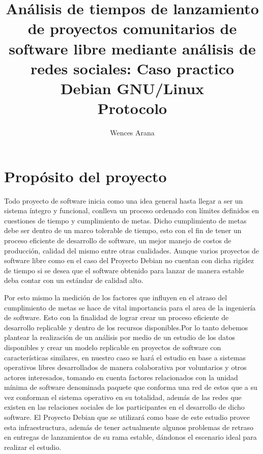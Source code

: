 \documentclass[12pt]{report}
\begin{document}
  \title{ {Análisis  de  tiempos  de  lanzamiento  de
proyectos comunitarios  de software  libre mediante análisis  de redes
sociales:   Caso   practico    Debian   GNU/Linux}
\\   {Protocolo}   }
\author{Wences Arana}
\maketitle

\tableofcontents
\chapter*{Propósito del proyecto}

Todo proyecto de software inicia como  una idea general hasta llegar a
ser un sistema  íntegro y funcional, conlleva un  proceso ordenado con
límites definidos  en cuestiones  de tiempo  y cumplimiento  de metas.
Dicho cumplimiento de  metas debe ser dentro de un  marco tolerable de
tiempo, esto con el fin de tener un proceso eficiente de desarrollo de
software, un mejor  manejo de costos de producción,  calidad del mismo
entre otras cualidades. Aunque varios proyectos de software libre como
en el caso del Proyecto Debian  no cuentan con dicha rigídez de tiempo
si se  desea que el  software obtenido  para lanzar de  manera estable
deba contar con un estándar de calidad alto.

Por esto mismo  la medición de los factores que  influyen en el atraso
del cumplimiento de metas se hace de vital importancia para el area de
la ingeniería  de software. Esto con  la finalidad de lograr  crear un
proceso eficiente  de desarrollo replicable  y dentro de  los recursos
disponibles.Por  lo  tanto  debemos  plantear  la  realización  de  un
análisis por medio  de un estudio de los datos  disponibles y crear un
modelo  replicable  en  proyectos   de  software  con  características
similares,  en nuestro  caso se  hará el  estudio en  base a  sistemas
operativos libres desarrollados de manera colaborativa por voluntarios
y otros  actores interesados, tomando en  cuenta factores relacionados
con la unidad  mínima de software denominada paquete  que conforma una
red  de estos  que  a su  vez  conforman el  sistema  operativo en  su
totalidad, además de las redes  que existen en las relaciones sociales
de los participantes  en el desarrollo de dicho  software. El Proyecto
Debian  que  se  utilizará  como  base de  este  estudio  provee  esta
infraestructura,  además de  tener  actualmente  algunos problemas  de
retraso en  entregas de lanzamientos  de su rama estable,  dándonos el
escenario ideal para realizar el estudio.
\end{document}
